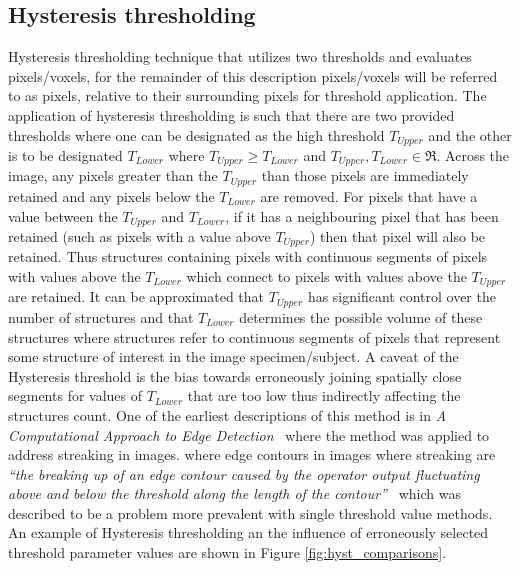 \subsection{Hysteresis thresholding} \label{sec:Hyst}
Hysteresis thresholding technique that utilizes two thresholds and evaluates pixels/voxels, for the remainder of this description pixels/voxels will be referred to as pixels, relative to their surrounding pixels for threshold application. The application of hysteresis thresholding is such that there are two provided thresholds where one can be designated as the high threshold $T_{Upper}$ and the other is to be designated $T_{Lower}$ where $T_{Upper} \geq T_{Lower}$ and $T_{Upper}, T_{Lower}\in\Re$. Across the image, any pixels greater than the $T_{Upper}$ than those pixels are immediately retained and any pixels below the $T_{Lower}$ are removed. For pixels that have a value between the $T_{Upper}$ and $T_{Lower}$, if it has a neighbouring pixel that has been retained (such as pixels with a value above $T_{Upper}$) then that pixel will also be retained. Thus structures containing pixels with continuous segments of pixels with values above the $T_{Lower}$ which connect to pixels with values above the $T_{Upper}$ are retained. It can be approximated that $T_{Upper}$ has significant control over the number of structures and that $T_{Lower}$ determines the possible volume of these structures where structures refer to continuous segments of pixels that represent some structure of interest in the image specimen/subject. A caveat of the Hysteresis threshold is the bias towards erroneously joining spatially close segments for values of $T_{Lower}$ that are too low thus indirectly affecting the structures count. One of the earliest descriptions of this method is in \textit{A Computational Approach to Edge Detection}~\cite{Hysteresis} where the method was applied to address streaking in images. where edge contours in images where streaking are \textit{``the breaking up of an edge contour caused by the operator output fluctuating above and below the threshold along the length of the contour''}~\cite[p. 689-690]{Hysteresis} which was described to be a problem more prevalent with single threshold value methods. An example of Hysteresis thresholding an the influence of erroneously selected threshold parameter values are shown in Figure \ref{fig:hyst_comparisons}.
